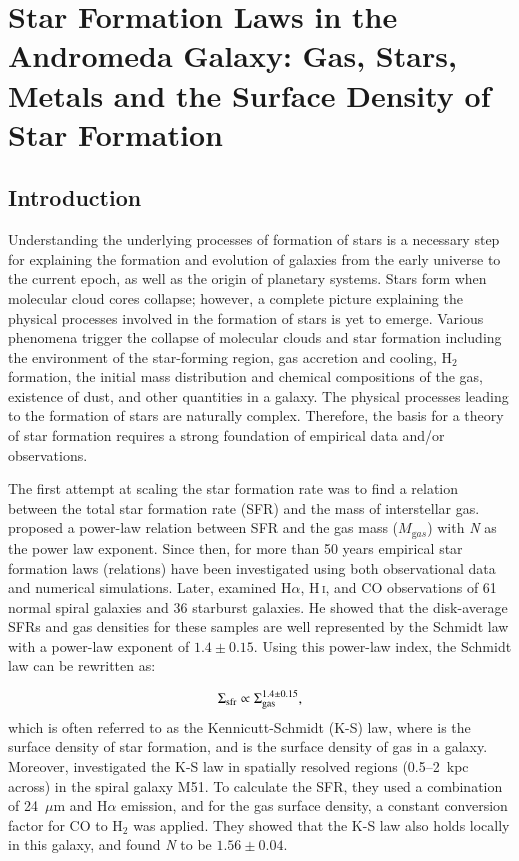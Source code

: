 \chapter[Star Formation Laws in M31]{Star Formation Laws in the Andromeda Galaxy: Gas, Stars, Metals and the Surface Density of Star Formation}
\label{ch: paper1}
\section{Introduction}
\label{sec: intro_sfl}

Understanding the underlying processes of formation of stars is a necessary step for explaining the formation and evolution of galaxies from the early universe to the current epoch, as well as the origin of planetary systems. Stars form when molecular cloud cores collapse; however, a complete picture explaining the physical processes involved in the formation of stars is yet to emerge. Various phenomena trigger the collapse of molecular clouds and star formation including the environment of the star-forming region, gas accretion and cooling, H$_2$ formation, the initial mass distribution and chemical compositions of the gas,  existence of dust, and other quantities in a galaxy. The physical processes leading to the formation of stars are naturally complex. Therefore, the basis for a theory of star formation requires a strong foundation of empirical data and/or observations.


The first attempt at scaling the star formation rate was to find a relation between the total star formation rate (SFR) and the mass of interstellar gas. \citet{Schmidt59} proposed a power-law relation between SFR and the gas mass ($M_{\mathrm gas}$) with {\it N} as the power law exponent. Since then, for more than 50 years empirical star formation laws (relations) have been investigated using both observational data and numerical simulations. Later, \citet{Kennicutt98a} examined H$\alpha$, H\,{\textsc i}, and CO observations of 61 normal spiral galaxies and 36 starburst galaxies. He showed that the disk-average SFRs and gas densities for these samples are well represented by the Schmidt law with a power-law exponent of $1.4 \pm 0.15$. Using this power-law index, the Schmidt law can be rewritten as: 

\begin{equation}
\label{equ:ks_org}
\Sigma_{\mathrm{sfr }} \propto \Sigma_{\mathrm {gas }}^{1.4\pm0.15},
\end{equation}
\noindent which is often referred to as the Kennicutt-Schmidt (K-S) law, where \sigmasfr is the surface density of star formation, and \sigmagas is the surface density of gas in a galaxy. Moreover, \citet{Kennicutt07} investigated the K-S law in spatially resolved regions (0.5--2~kpc across) in the spiral galaxy M51. To calculate the SFR, they used a combination of 24~$\mu$m and H${\alpha}$ emission, and for the gas surface density, a constant conversion factor for CO to H$_2$ was applied. They showed that the K-S law also holds locally in this galaxy, and found {\it N} to be $1.56 \pm 0.04$.

